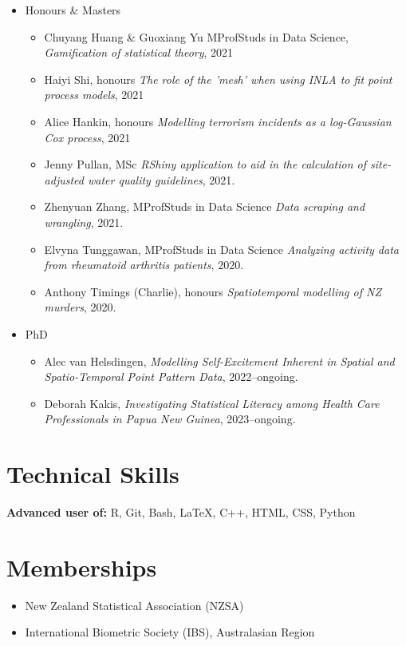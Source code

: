 \documentclass[10pt,a4paper]{moderncv}
\begin{document}
\begin{itemize}
\item Honours \& Masters
  \begin{itemize}
  \item Chuyang Huang \& Guoxiang Yu MProfStuds in Data Science, \textit{Gamification of statistical theory}, 2021
  \item Haiyi Shi, honours \textit{The role of the 'mesh' when using INLA to fit point process models}, 2021
  \item Alice Hankin, honours \textit{Modelling terrorism incidents as a log-Gaussian Cox process}, 2021
  \item Jenny Pullan, MSc \textit{RShiny application to aid in the calculation of site-adjusted water quality guidelines}, 2021.
  \item Zhenyuan Zhang, MProfStuds in Data Science \textit{Data scraping and wrangling}, 2021.
  \item Elvyna Tunggawan, MProfStuds in Data Science \textit{Analyzing activity data from rheumatoid arthritis patients}, 2020.
  \item Anthony Timings (Charlie), honours \textit{Spatiotemporal modelling of NZ murders}, 2020.
  \end{itemize}
\item PhD
  \begin{itemize}
  \item Alec van Helsdingen, \textit{Modelling Self-Excitement Inherent in Spatial and Spatio-Temporal Point Pattern Data}, 2022--ongoing.
   \item Deborah Kakis, \textit{Investigating Statistical Literacy among Health Care Professionals in Papua New Guinea}, 2023--ongoing.
  \end{itemize}
\end{itemize}


\section{Technical Skills}

\vspace{6pt}
\textbf{Advanced user of:} R, Git, Bash, \LaTeX, C++, HTML, CSS, Python

\section{Memberships}

\vspace{6pt}
\begin{itemize}
\item New Zealand Statistical Association (NZSA)
\item International Biometric Society (IBS), Australasian Region
\end{itemize}
\end{document}

